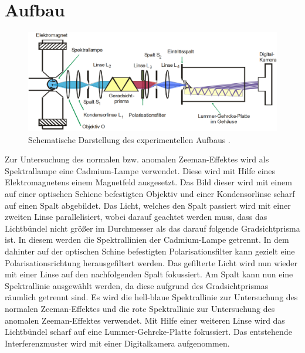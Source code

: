\section{Aufbau}
\label{sec:Aufbau}
\begin{figure}
	\centering
	\includegraphics[width=\linewidth-50pt,height=\textheight-50pt,keepaspectratio]{content/Images/schema.png}
	\caption{Schematische Darstellung des experimentellen Aufbaus \cite{V27}.}
	\label{fig:schema}
\end{figure}

Zur Untersuchung des normalen bzw. anomalen Zeeman-Effektes wird als Spektrallampe eine Cadmium-Lampe verwendet. Diese wird mit Hilfe eines Elektromagnetens einem Magnetfeld ausgesetzt. Das Bild dieser wird mit einem auf einer optischen Schiene befestigten Objektiv und einer Kondensorlinse scharf auf einen Spalt abgebildet. Das Licht, welches den Spalt passiert wird mit einer zweiten Linse parallelisiert, wobei darauf geachtet werden muss, dass das Lichtbündel nicht größer im Durchmesser als das darauf folgende Gradsichtprisma ist. In diesem werden die Spektrallinien der Cadmium-Lampe getrennt. In dem dahinter auf der optischen Schine befestigten Polarisationsfilter kann gezielt eine Polarisationsrichtung herausgefiltert werden. Das gefilterte Licht wird nun wieder mit einer Linse auf den nachfolgenden Spalt fokussiert. Am Spalt kann nun eine Spektrallinie ausgewählt werden, da diese aufgrund des Gradsichtprismas räumlich getrennt sind. Es wird die hell-blaue Spektrallinie zur Untersuchung des normalen Zeeman-Effektes und die rote Spektrallinie zur Untersuchung des anomalen Zeeman-Effektes verwendet. Mit Hilfe einer weiteren Linse wird das Lichtbündel scharf auf eine Lummer-Gehrcke-Platte fokussiert. Das entstehende Interferenzmuster wird mit einer Digitalkamera aufgenommen.